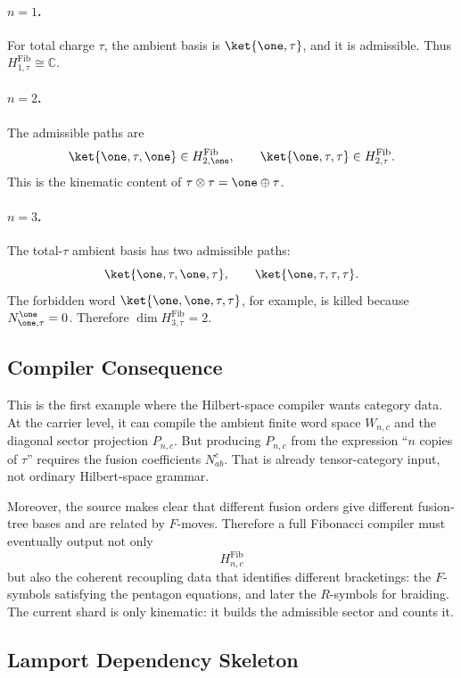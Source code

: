 \paragraph{\(n=1\).}
For total charge \(\tau\), the ambient basis is \(\ket{\one,\tau}\), and it is
admissible.  Thus \(H^{\mathrm{Fib}}_{1,\tau}\cong\mathbb C\).

\paragraph{\(n=2\).}
The admissible paths are
\[
  \ket{\one,\tau,\one}\in H^{\mathrm{Fib}}_{2,\one},\qquad
  \ket{\one,\tau,\tau}\in H^{\mathrm{Fib}}_{2,\tau}.
\]
This is the kinematic content of
\(\tau\otimes\tau=\one\oplus\tau\).

\paragraph{\(n=3\).}
The total-\(\tau\) ambient basis has two admissible paths:
\[
  \ket{\one,\tau,\one,\tau},\qquad
  \ket{\one,\tau,\tau,\tau}.
\]
The forbidden word \(\ket{\one,\one,\tau,\tau}\), for example, is killed because
\(N_{\one,\tau}^{\one}=0\).  Therefore
\(\dim H^{\mathrm{Fib}}_{3,\tau}=2\).

\subsection{Compiler Consequence}

This is the first example where the Hilbert-space compiler wants category data.
At the carrier level, it can compile the ambient finite word space \(W_{n,c}\)
and the diagonal sector projection \(P_{n,c}\).  But producing \(P_{n,c}\) from
the expression ``\(n\) copies of \(\tau\)'' requires the fusion coefficients
\(N_{ab}^c\).  That is already tensor-category input, not ordinary
Hilbert-space grammar.

Moreover, the source makes clear that different fusion orders give different
fusion-tree bases and are related by \(F\)-moves.  Therefore a full Fibonacci
compiler must eventually output not only
\[
  H^{\mathrm{Fib}}_{n,c}
\]
but also the coherent recoupling data that identifies different bracketings:
the \(F\)-symbols satisfying the pentagon equations, and later the \(R\)-symbols
for braiding.  The current shard is only kinematic: it builds the admissible
sector and counts it.

\subsection{Lamport Dependency Skeleton}


